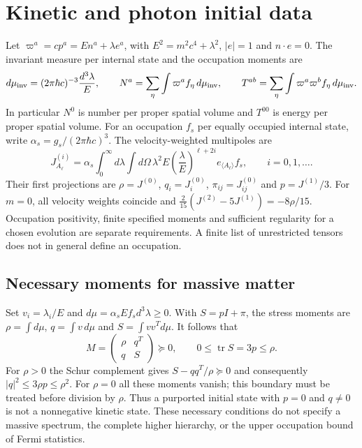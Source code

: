 \section{Kinetic and photon initial data}
\label{geo:kinetic_initial}
Let $\varpi^a=cp^a=En^a+\lambda e^a$, with $E^2=m^2c^4+\lambda^2$, $|e|=1$ and $n\cdot e=0$. The invariant measure per internal state and the occupation moments are
\begin{equation}
 d\mu_{\rm inv}=(2\pi\hbar c)^{-3}\frac{d^3\lambda}{E},\qquad
 N^a=\sum_\eta\int\varpi^a f_\eta\,d\mu_{\rm inv},\qquad
 T^{ab}=\sum_\eta\int\varpi^a\varpi^b f_\eta\,d\mu_{\rm inv}.
 \label{geo:mass_shell}
\end{equation}
In particular $N^0$ is number per proper spatial volume and $T^{00}$ is energy per proper spatial volume. For an occupation $f_s$ per equally occupied internal state, write $\alpha_s=g_s/(2\pi\hbar c)^3$. The velocity-weighted multipoles are
\begin{equation}
 J^{(i)}_{A_\ell}=\alpha_s\int_0^\infty d\lambda\int d\Omega\,
 \lambda^2 E\left(\frac\lambda E\right)^{\ell+2i}
 e_{\langle A_\ell\rangle}f_s,\qquad i=0,1,\ldots.
 \label{geo:massive_moments}
\end{equation}
Their first projections are $\rho=J^{(0)}$, $q_i=J^{(0)}_i$, $\pi_{ij}=J^{(0)}_{ij}$ and $p=J^{(1)}/3$. For $m=0$, all velocity weights coincide and
$\frac{2}{15}(J^{(2)}-5J^{(1)})=-8\rho/15$.
Occupation positivity, finite specified moments and sufficient regularity for a chosen evolution are separate requirements. A finite list of unrestricted tensors does not in general define an occupation.

\subsection{Necessary moments for massive matter}
\label{geo:massive_positivity}
Set $v_i=\lambda_i/E$ and $d\mu=\alpha_s E f_s d^3\lambda\ge0$. With $S=pI+\pi$, the stress moments are $\rho=\int d\mu$, $q=\int v\,d\mu$ and $S=\int vv^T d\mu$. It follows that
\begin{equation}
 M=\begin{pmatrix}\rho&q^T\\q&S\end{pmatrix}\succeq0,
 \qquad 0\le\operatorname{tr}S=3p\le\rho.
 \label{geo:massive_moment_cone}
\end{equation}
For $\rho>0$ the Schur complement gives $S-qq^T/\rho\succeq0$ and consequently $|q|^2\le3\rho p\le\rho^2$. For $\rho=0$ all these moments vanish; this boundary must be treated before division by $\rho$. Thus a purported initial state with $p=0$ and $q\ne0$ is not a nonnegative kinetic state. These necessary conditions do not specify a massive spectrum, the complete higher hierarchy, or the upper occupation bound of Fermi statistics.

